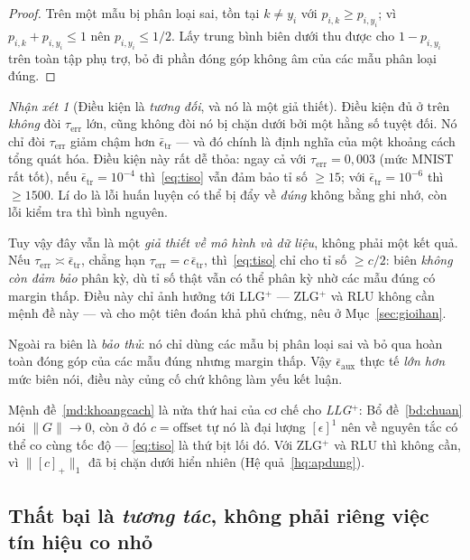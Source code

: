\documentclass[11pt]{article}
\theoremstyle{remark}
\newtheorem{nhanxet}[dinhly]{Nhận xét}
\newcommand{\pos}[1]{\left[#1\right]_+}
\begin{document}
\begin{proof}
Trên một mẫu bị phân loại sai, tồn tại $k \ne y_i$ với
$p_{i,k} \ge p_{i,y_i}$; vì $p_{i,k} + p_{i,y_i} \le 1$ nên
$p_{i,y_i} \le 1/2$. Lấy trung bình biên dưới thu được cho $1 - p_{i,y_i}$
trên toàn tập phụ trợ, bỏ đi phần đóng góp không âm của các mẫu phân loại
đúng.
\end{proof}

\begin{nhanxet}[Điều kiện là \emph{tương đối}, và nó là một giả thiết]
\label{nx:tiso}
Điều kiện đủ ở trên \emph{không} đòi $\tau_{\mathrm{err}}$ lớn, cũng
không đòi nó bị chặn dưới bởi một hằng số tuyệt đối. Nó chỉ đòi
$\tau_{\mathrm{err}}$ giảm chậm hơn $\bar\epsilon_{\mathrm{tr}}$ --- và đó
chính là định nghĩa của một khoảng cách tổng quát hóa. Điều kiện này rất dễ
thỏa: ngay cả với $\tau_{\mathrm{err}} = 0{,}003$ (mức MNIST rất tốt), nếu
$\bar\epsilon_{\mathrm{tr}} = 10^{-4}$ thì~\eqref{eq:tiso} vẫn đảm bảo tỉ số
$\ge 15$; với $\bar\epsilon_{\mathrm{tr}} = 10^{-6}$ thì $\ge 1500$. Lí do là
lỗi huấn luyện có thể bị đẩy về \emph{đúng} không bằng ghi nhớ, còn lỗi kiểm
tra thì bình nguyên.

Tuy vậy đây vẫn là một \emph{giả thiết về mô hình và dữ liệu}, không phải một
kết quả. Nếu $\tau_{\mathrm{err}} \asymp \bar\epsilon_{\mathrm{tr}}$, chẳng
hạn $\tau_{\mathrm{err}} = c\,\bar\epsilon_{\mathrm{tr}}$, thì~\eqref{eq:tiso}
chỉ cho tỉ số $\ge c/2$: biên \emph{không còn đảm bảo} phân kỳ, dù tỉ số thật
vẫn có thể phân kỳ nhờ các mẫu đúng có margin thấp. Điều này chỉ ảnh hưởng
tới LLG$^+$ --- ZLG$^+$ và RLU không cần mệnh đề này --- và cho một tiên đoán
khả phủ chứng, nêu ở Mục~\ref{sec:gioihan}.

Ngoài ra biên là \emph{bảo thủ}: nó chỉ dùng các mẫu bị phân loại sai và bỏ
qua hoàn toàn đóng góp của các mẫu đúng nhưng margin thấp. Vậy
$\bar\epsilon_{\mathrm{aux}}$ thực tế \emph{lớn hơn} mức biên nói, điều này
củng cố chứ không làm yếu kết luận.
\end{nhanxet}

Mệnh đề~\ref{md:khoangcach} là nửa thứ hai của cơ chế cho \emph{LLG$^+$}:
Bổ đề~\ref{bd:chuan} nói $\|G\| \to 0$, còn ở đó $c = \mathrm{offset}$ tự nó
là đại lượng $[\epsilon]^1$ nên về nguyên tắc có thể co cùng tốc độ ---
\eqref{eq:tiso} là thứ bịt lối đó. Với ZLG$^+$ và RLU thì không cần, vì
$\|\pos{c}\|_1$ đã bị chặn dưới hiển nhiên (Hệ quả~\ref{hq:apdung}).

\subsection{Thất bại là \emph{tương tác}, không phải riêng việc tín hiệu co nhỏ}
\label{sec:tuongtac}
\end{document}
